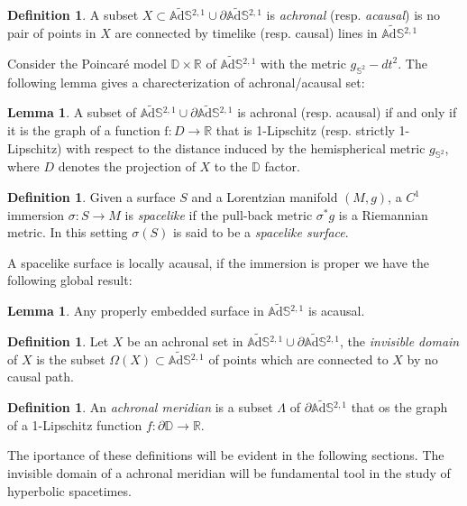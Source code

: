 \documentclass[10pt,a4paper,oneside,reqno]{book}
\def\R{\mathbb{R}}
\def\D{\mathbb{D}}
\def\AS{\widetilde{\mathbb{A}\mathrm{d}\mathbb{S}}{}}
\theoremstyle{plain}
\theoremstyle{definition}
\newtheorem{definition}[theorem]{Definition} %
\newtheorem{lemma}[theorem]{Lemma} %
\theoremstyle{plain}
\theoremstyle{plain}
\theoremstyle{mystyleNormalFont}
\begin{document}
\begin{definition}
    A subset $X \subset \AS^{2,1} \cup \partial\AS^{2,1}$ is \textit{achronal} (resp. \textit{acausal}) is no pair of points in $X$ are connected by timelike (resp. causal) lines in $\AS^{2,1}$
\end{definition}
Consider the Poincaré model $\D\times\R$ of $\AS^{2,1}$ with the metric $g_{\mathbb{S}^2} - dt^2$. The following lemma gives a charecterization of achronal/acausal set:
\begin{lemma}
    A subset of $\AS^{2,1} \cup \partial\AS^{2,1}$ is achronal (resp. acausal) if and only if it is the graph of a function $\text{f} : D \to \R$ that is 1-Lipschitz (resp. strictly 1-Lipschitz) with respect to the distance induced by the hemispherical metric $g_{\mathbb{S}^2}$, where $D$ denotes the projection of $X$ to the $\D$ factor.
\end{lemma} 
\begin{definition}
    Given a surface $S$ and a Lorentzian manifold $(M,g)$, a $C^1$ immersion $\sigma : S \to M$ is \textit{spacelike} if the pull-back metric $\sigma^* g$ is a Riemannian metric. In this setting $\sigma(S)$ is said to be a \textit{spacelike surface}.
\end{definition}
A spacelike surface is locally acausal, if the immersion is proper we have the following global result:
\begin{lemma}
    Any properly embedded surface in $\AS^{2,1}$ is acausal.
\end{lemma}
\begin{definition}
    Let $X$ be an achronal set in $\AS^{2,1} \cup \partial\AS^{2,1}$, the \textit{invisible domain} of $X$ is the subset $\Omega(X) \subset \AS^{2,1}$ of points which are connected to $X$ by no causal path.
\end{definition}
\begin{definition}
    An \textit{achronal meridian} is a subset $\Lambda$ of $\partial\AS^{2,1}$ that os the graph of a 1-Lipschitz function $f: \partial\D\to\R$.
\end{definition}
The iportance of these definitions will be evident in the following sections.
The invisible domain of a achronal meridian will be fundamental tool in the study of hyperbolic spacetimes.
\end{document}
